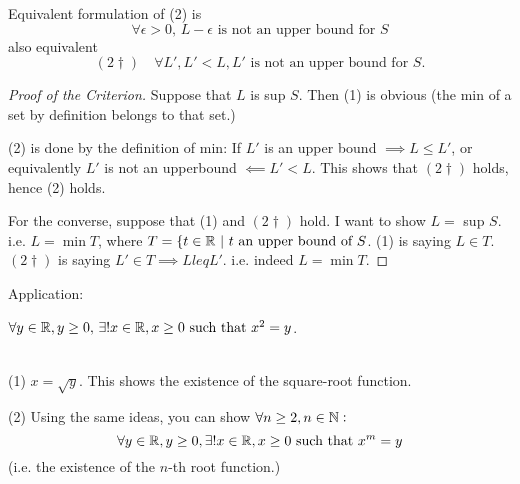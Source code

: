 \documentclass[twoside]{scrartcl}
\begin{document}
Equivalent formulation of (2) is 
\[\forall \epsilon > 0,\, L-\epsilon \text{ is not an upper bound for } S\]
also equivalent
\[(2\dagger) \quad \forall L', L'<L, L' \text{ is not an upper bound for } S.\]
\begin{proof}[Proof of the Criterion]
	Suppose that $L$ is sup $S$. Then (1) is obvious (the min of a set by definition belongs to that set.)
	
(2) is done by the definition of min: If $L'$ is an upper bound $\implies L \leq L'$, or equivalently $L'$ is not an upperbound $\impliedby L' <L$. This shows that $(2\dagger)$ holds, hence (2) holds. 
	
	For the converse, suppose that (1) and $(2\dagger)$ hold. I want to show $L =$ sup $S$. i.e. $L = \min T$, where $T = \{t \in\mathbb{R} ~|~ t \text{ an upper bound of } S$. (1) is saying $L \in T$. $(2\dagger)$ is saying $L' \in T \implies L leq L'$. i.e. indeed $L = \min T$.
\end{proof}

Application: 
\begin{theorem}
$\forall y \in\mathbb{R}, y \geq 0,\,\exists! x \in\mathbb{R}, x \geq 0\text{ such that }x^2 =y$.
\end{theorem}\vspace*{5pt}

\begin{remark}~\\

(1) $x = \sqrt{y}$. This shows the existence of the square-root function.

(2) Using the same ideas, you can show $\forall n \geq 2, n \in\mathbb{N}:$
\[\forall y\in\mathbb{R}, y\geq 0, \exists! x \in\mathbb{R}, x\geq 0 \text{ such that } x^m = y\]	
(i.e. the existence of the $n$-th root function.)
\end{remark}
\end{document}
